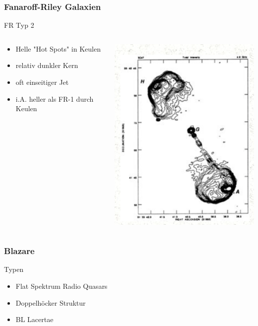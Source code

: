 \documentclass[aspectratio=1610, 9pt]{beamer}
\begin{document}
\begin{frame}\frametitle{Fanaroff-Riley Galaxien}
  \begin{block}{FR Typ 2}
  \begin{columns}
  \begin{column}[c]{0.45\linewidth}
    \begin{itemize}
      \item Helle "Hot Spots" in Keulen
      \item relativ dunkler Kern
      \item oft einseitiger Jet
      \item i.A. heller als FR-1 durch Keulen
    \end{itemize}
  \end{column}
  \begin{column}[c]{0.45\linewidth}
    \includegraphics{images/FR2.png}
  \end{column}
  \end{columns}
  \end{block}
\end{frame}

\begin{frame}\frametitle{Blazare}
  \begin{block}{Typen}
    \begin{itemize}
      \item Flat Spektrum Radio Quasars
      \item Doppelh\"ocker Struktur
      \item BL Lacertae
    \end{itemize}
  \end{block}
\end{frame}
\end{document}
